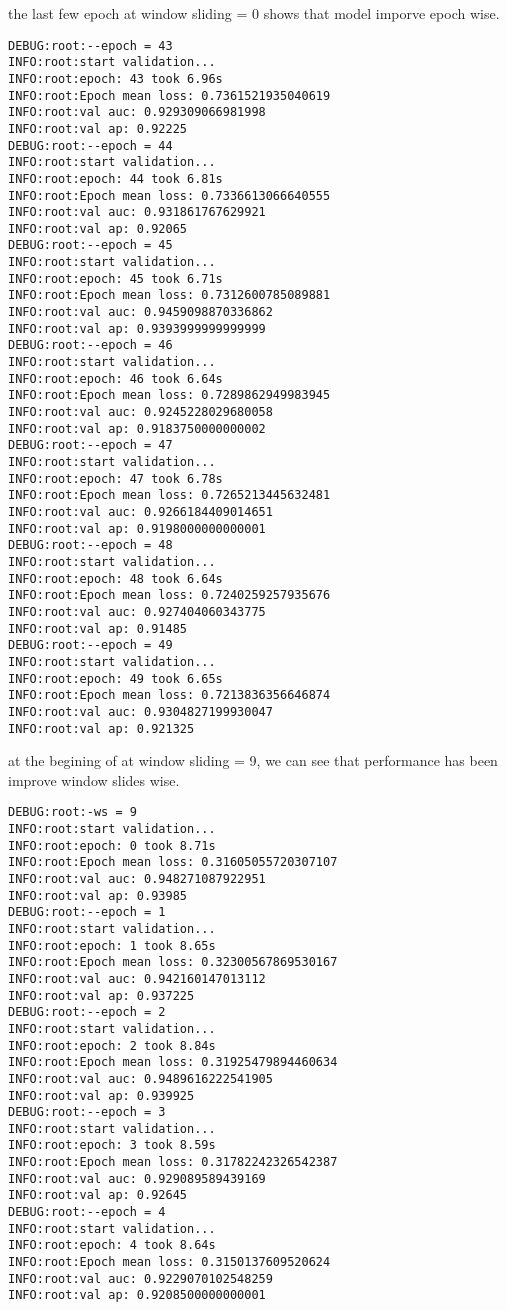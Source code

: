 \documentclass[11pt]{article}
\begin{document}
the last few epoch at window sliding = 0 shows that model imporve epoch wise.
\begin{verbatim}
DEBUG:root:--epoch = 43
INFO:root:start validation...
INFO:root:epoch: 43 took 6.96s
INFO:root:Epoch mean loss: 0.7361521935040619
INFO:root:val auc: 0.929309066981998
INFO:root:val ap: 0.92225
DEBUG:root:--epoch = 44
INFO:root:start validation...
INFO:root:epoch: 44 took 6.81s
INFO:root:Epoch mean loss: 0.7336613066640555
INFO:root:val auc: 0.931861767629921
INFO:root:val ap: 0.92065
DEBUG:root:--epoch = 45
INFO:root:start validation...
INFO:root:epoch: 45 took 6.71s
INFO:root:Epoch mean loss: 0.7312600785089881
INFO:root:val auc: 0.9459098870336862
INFO:root:val ap: 0.9393999999999999
DEBUG:root:--epoch = 46
INFO:root:start validation...
INFO:root:epoch: 46 took 6.64s
INFO:root:Epoch mean loss: 0.7289862949983945
INFO:root:val auc: 0.9245228029680058
INFO:root:val ap: 0.9183750000000002
DEBUG:root:--epoch = 47
INFO:root:start validation...
INFO:root:epoch: 47 took 6.78s
INFO:root:Epoch mean loss: 0.7265213445632481
INFO:root:val auc: 0.9266184409014651
INFO:root:val ap: 0.9198000000000001
DEBUG:root:--epoch = 48
INFO:root:start validation...
INFO:root:epoch: 48 took 6.64s
INFO:root:Epoch mean loss: 0.7240259257935676
INFO:root:val auc: 0.927404060343775
INFO:root:val ap: 0.91485
DEBUG:root:--epoch = 49
INFO:root:start validation...
INFO:root:epoch: 49 took 6.65s
INFO:root:Epoch mean loss: 0.7213836356646874
INFO:root:val auc: 0.9304827199930047
INFO:root:val ap: 0.921325

\end{verbatim}

at the begining of at window sliding = 9, we  can see that performance has been improve window slides wise.
\begin{verbatim}
DEBUG:root:-ws = 9
INFO:root:start validation...
INFO:root:epoch: 0 took 8.71s
INFO:root:Epoch mean loss: 0.31605055720307107
INFO:root:val auc: 0.948271087922951
INFO:root:val ap: 0.93985
DEBUG:root:--epoch = 1
INFO:root:start validation...
INFO:root:epoch: 1 took 8.65s
INFO:root:Epoch mean loss: 0.32300567869530167
INFO:root:val auc: 0.942160147013112
INFO:root:val ap: 0.937225
DEBUG:root:--epoch = 2
INFO:root:start validation...
INFO:root:epoch: 2 took 8.84s
INFO:root:Epoch mean loss: 0.31925479894460634
INFO:root:val auc: 0.9489616222541905
INFO:root:val ap: 0.939925
DEBUG:root:--epoch = 3
INFO:root:start validation...
INFO:root:epoch: 3 took 8.59s
INFO:root:Epoch mean loss: 0.31782242326542387
INFO:root:val auc: 0.929089589439169
INFO:root:val ap: 0.92645
DEBUG:root:--epoch = 4
INFO:root:start validation...
INFO:root:epoch: 4 took 8.64s
INFO:root:Epoch mean loss: 0.3150137609520624
INFO:root:val auc: 0.9229070102548259
INFO:root:val ap: 0.9208500000000001
\end{verbatim}
\end{document}
